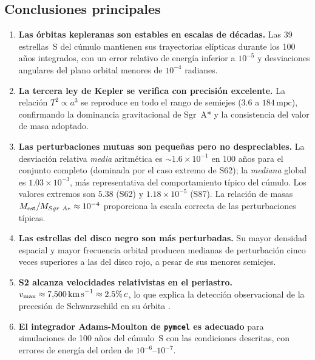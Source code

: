 \documentclass[12pt,a4paper]{article}
\newcommand{\SgrA}{Sgr~A*}
\newcommand{\mpc}{\text{mpc}}
\newcommand{\vmax}{v_{\rm max}}
\begin{document}
\subsection{Conclusiones principales}
\label{subsec:conclusiones}

\begin{enumerate}[label=\textbf{C\arabic*.}, itemsep=5pt]
  \item \textbf{Las órbitas kepleranas son estables en escalas de décadas.}
    Las 39 estrellas~S del cúmulo mantienen sus trayectorias elípticas durante los
    100 años integrados, con un error relativo de energía inferior a $10^{-5}$ y
    desviaciones angulares del plano orbital menores de $10^{-4}$ radianes.

  \item \textbf{La tercera ley de Kepler se verifica con precisión excelente.}
    La relación $T^2 \propto a^3$ se reproduce en todo el rango de semiejes
    ($3.6$ a $184\,\mpc$), confirmando la dominancia gravitacional de \SgrA{} y
    la consistencia del valor de masa adoptado.

  \item \textbf{Las perturbaciones mutuas son pequeñas pero no despreciables.}
    La desviación relativa \emph{media} aritmética es $\sim 1.6 \times 10^{-1}$ en
    100 años para el conjunto completo (dominada por el caso extremo de S62); la
    \emph{mediana} global es $1.03 \times 10^{-3}$, más representativa del
    comportamiento típico del cúmulo.  Los valores extremos son $5.38$ (S62) y
    $1.18 \times 10^{-5}$ (S87).  La relación de masas
    $M_{\rm est}/M_{\SgrA} \approx 10^{-4}$ proporciona la escala correcta de
    las perturbaciones típicas.

  \item \textbf{Las estrellas del disco negro son más perturbadas.}
    Su mayor densidad espacial y mayor frecuencia orbital producen medianas de
    perturbación cinco veces superiores a las del disco rojo, a pesar de sus menores
    semiejes.

  \item \textbf{S2 alcanza velocidades relativistas en el periastro.}
    $\vmax \approx 7{,}500\,\text{km\,s}^{-1} \approx 2.5\%\,c$, lo que explica la
    detección observacional de la precesión de Schwarzschild en su órbita
    \citep{ciurlo2025sagittarius}.

  \item \textbf{El integrador Adams-Moulton de \texttt{pymcel} es adecuado} \citep{zuluaga2026pymcel} para
    simulaciones de 100 años del cúmulo~S con las condiciones descritas, con errores
    de energía del orden de $10^{-6}$--$10^{-7}$.
\end{enumerate}
\end{document}
